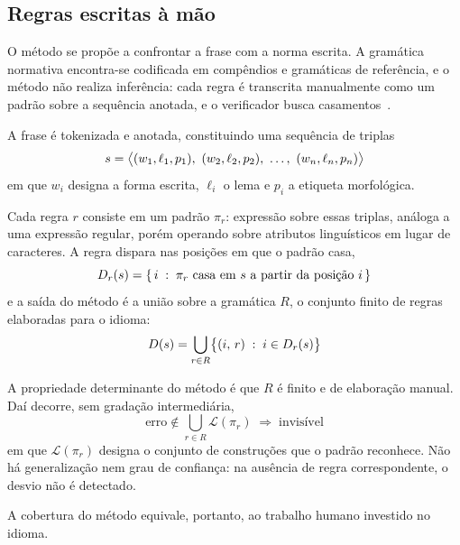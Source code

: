 \subsection{Regras escritas à mão}
\label{met:regras}

\indent\indent O método se propõe a confrontar a frase com a norma escrita. A gramática normativa
encontra-se codificada em compêndios e gramáticas de referência, e o método não realiza
inferência: cada regra é transcrita manualmente como um padrão sobre a sequência anotada, e o
verificador busca casamentos~\cite{naber2003,milkowski2010}.

A frase é tokenizada e anotada, constituindo uma sequência de triplas
%
\begin{equation}
\sent = \bigl\langle (w_1, \ell_1, p_1),\ (w_2, \ell_2, p_2),\ \ldots,\ (w_n, \ell_n, p_n) \bigr\rangle
\label{eq:regras-seq}
\end{equation}
%
em que $w_i$ designa a forma escrita, $\ell_i$ o lema e $p_i$ a etiqueta morfológica.

Cada regra $r$ consiste em um padrão $\pi_r$: expressão sobre essas triplas, análoga a uma
expressão regular, porém operando sobre atributos linguísticos em lugar de caracteres. A
regra dispara nas posições em que o padrão casa,
%
\begin{equation}
D_r(s) = \{\, i \;:\; \pi_r \text{ casa em } s \text{ a partir da posição } i \,\}
\label{eq:regras-Dr}
\end{equation}
%
e a saída do método é a união sobre a gramática $R$, o conjunto finito de regras elaboradas
para o idioma:
%
\begin{equation}
D(s) = \bigcup_{r \in R} \bigl\{ (i,\, r) \;:\; i \in D_r(s) \bigr\}
\label{eq:regras-D}
\end{equation}

A propriedade determinante do método é que $R$ é finito e de elaboração manual. Daí decorre,
sem gradação intermediária,
%
\begin{equation}
\text{erro} \notin \bigcup_{r \in R} \mathcal{L}(\pi_r) \;\Longrightarrow\; \text{invisível}
\label{eq:regras-invisivel}
\end{equation}
%
em que $\mathcal{L}(\pi_r)$ designa o conjunto de construções que o padrão reconhece. Não há
generalização nem grau de confiança: na ausência de regra correspondente, o desvio não é
detectado.

A cobertura do método equivale, portanto, ao trabalho humano investido no idioma.
